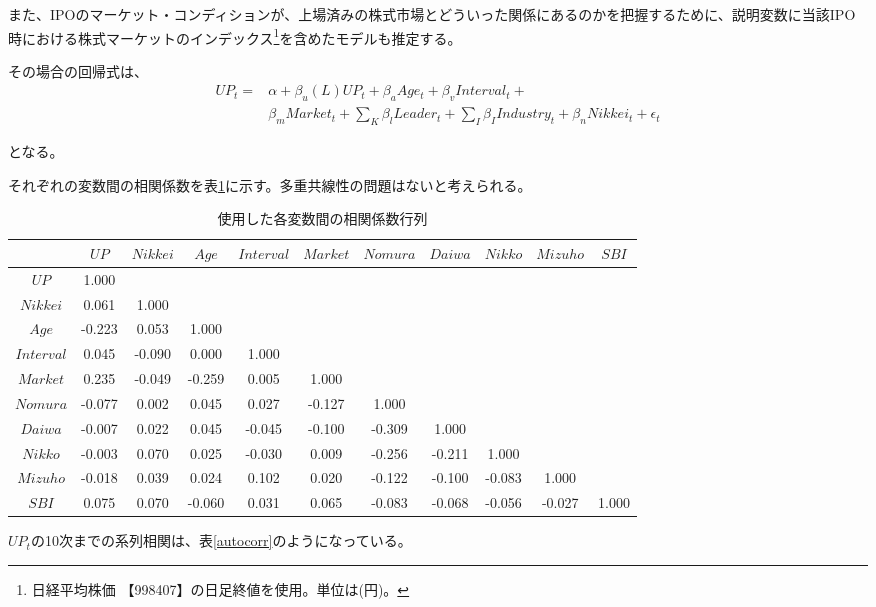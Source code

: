 \documentclass{jsarticle}
\begin{document}
  \par
また、IPOのマーケット・コンディションが、上場済みの株式市場とどういった関係にあるのかを把握するために、説明変数に当該IPO時における株式マーケットのインデックス\footnote[17]{日経平均株価 【998407】の日足終値を使用。単位は(円)。}を含めたモデルも推定する。\par
その場合の回帰式は、
\begin{equation}
\label{nikkeireg}
\begin{split}
	UP_t =  &\alpha + \beta_u (L) UP_t + \beta_a Age_t + \beta_v Interval_t + \\
	   &\beta_m Market_t + \sum_{K} \beta_l Leader_t +  \sum_{I} \beta_I Industry_t + \beta_n Nikkei_t+  \epsilon_t
\end{split}
\end{equation}

となる。\par


それぞれの変数間の相関係数を表\ref{corr}に示す。多重共線性の問題はないと考えられる。
\begin{table}[t]
  \begin{center}
  \caption{使用した各変数間の相関係数行列}
\begin{tabular}{c|cccccccccc}
\hline
 & $UP$ & $Nikkei$ & $Age$ & $Interval$ & $Market$ & $Nomura$ & $Daiwa$ & $Nikko$ & $Mizuho$ & $SBI$ \\
 \hline
$UP$ & 1.000 & &&&&&&&& \\
$Nikkei$ & 0.061 & 1.000 & &&&&&&& \\
$Age$ & -0.223 & 0.053 & 1.000 & &&&&&&  \\
$Interval$ & 0.045 & -0.090 & 0.000 & 1.000 & &&&&& \\
$Market$ & 0.235 & -0.049 & -0.259 & 0.005 & 1.000 & &&&& \\
$Nomura$ & -0.077 & 0.002 & 0.045 & 0.027 & -0.127 & 1.000 & &&& \\
$Daiwa$ & -0.007 & 0.022 & 0.045 & -0.045 & -0.100 & -0.309 & 1.000 & && \\
$Nikko$ & -0.003 & 0.070 & 0.025 & -0.030 & 0.009 & -0.256 & -0.211 & 1.000 &  &  \\
$Mizuho$ & -0.018 & 0.039 & 0.024 & 0.102 & 0.020 & -0.122 & -0.100 & -0.083 & 1.000 & \\
$SBI$ & 0.075 & 0.070 & -0.060 & 0.031 & 0.065 & -0.083 & -0.068 & -0.056 & -0.027 & 1.000 \\
\hline
	\end{tabular}
	\label{corr} 
  \end{center}
\end{table}
\par
$UP_t$の10次までの系列相関は、表\ref{autocorr}のようになっている。
\end{document}
